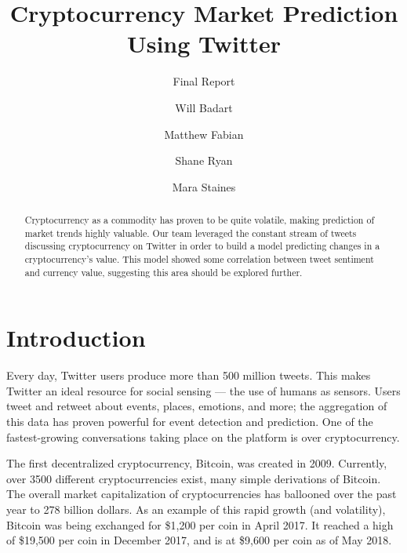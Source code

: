 \documentclass[sigconf]{acmart}
\begin{document}
\renewcommand\footnotetextcopyrightpermission[1]{} %
\pagestyle{plain} %

\title{Cryptocurrency Market Prediction Using Twitter}
\subtitle{Final Report}

\author{Will Badart}

\author{Matthew Fabian}

\author{Shane Ryan}

\author{Mara Staines}


\begin{abstract}
Cryptocurrency as a commodity has proven to be quite volatile, making prediction of market trends highly valuable. Our team leveraged the constant stream of tweets discussing cryptocurrency on Twitter in order to build a model predicting changes in a cryptocurrency's value. This model showed some correlation between tweet sentiment and currency value, suggesting this area should be explored further.
\end{abstract}

\maketitle


\section{Introduction}
Every day, Twitter users produce more than 500 million tweets\cite{sayce}. This makes Twitter an ideal resource for social sensing --- the use of humans as sensors. Users tweet and retweet about events, places, emotions, and more; the aggregation of this data has proven powerful for event detection and prediction. One of the fastest-growing conversations taking place on the platform is over cryptocurrency.

The first decentralized cryptocurrency, Bitcoin, was created in 2009. Currently, over 3500 different cryptocurrencies exist, many simple derivations of Bitcoin. The overall market capitalization of cryptocurrencies has ballooned over the past year to 278 billion dollars. As an example of this rapid growth (and volatility), Bitcoin was being exchanged for \$1,200 per coin in April 2017. It reached a high of \$19,500 per coin in December 2017, and is at \$9,600 per coin as of May 2018.
\end{document}
